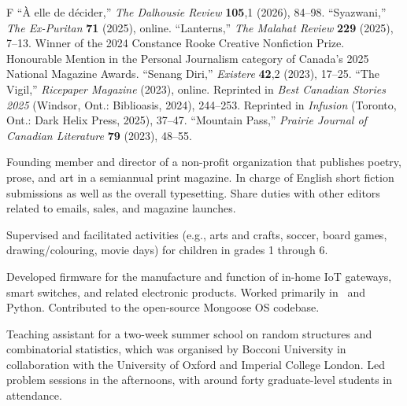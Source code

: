 \goodbreak
{}

\pubbegin F
\ficitem ``{\`A elle de d\'ecider,}'' {\sl The Dalhousie Review} {\bf 105},1 (2026), 84--98.
\ficitem ``Syazwani,'' {\sl The Ex-Puritan} {\bf 71} (2025), online.
\starficitem ``Lanterns,'' {\sl The Malahat Review} {\bf 229} (2025), 7--13.
Winner of the 2024 Constance Rooke Creative Nonfiction Prize. Honourable Mention in the Personal Journalism
category of Canada's 2025 National Magazine Awards.
\ficitem ``Senang Diri,'' {\sl Existere} {\bf 42},2 (2023), 17--25.
\ficitem ``The Vigil,'' {\sl Ricepaper Magazine} (2023), online. Reprinted in
{\sl Best Canadian Stories 2025} (Windsor, Ont.: Biblioasis, 2024), 244--253.
Reprinted in {\sl Infusion} (Toronto, Ont.: Dark Helix Press, 2025), 37--47.
\ficitem ``Mountain Pass,'' {\sl Prairie Journal of Canadian Literature} {\bf 79} (2023), 48--55.
\endgroup%


\smallskip
Founding member and director of a non-profit organization
that publishes poetry, prose, and art in a semiannual print magazine.
In charge of English short fiction submissions as well as the overall typesetting.
Share duties with other editors related to emails, sales, and magazine launches.
\medbreak

\smallskip
Supervised and facilitated activities (e.g., arts and crafts, soccer, board games, drawing/colouring, movie
days) for children in grades 1 through 6.
\medbreak

\smallskip
Developed firmware for the manufacture and function of in-home IoT gateways, smart switches,
and related electronic products. Worked primarily in \CEE\ and Python. Contributed to the open-source
Mongoose OS codebase.
\medbreak

\smallskip
Teaching assistant for a two-week summer school on random structures and combinatorial statistics,
which was
organised by Bocconi University in collaboration with the University of Oxford
and Imperial College London. Led problem sessions in the afternoons, with
around forty graduate-level students in attendance.
\medbreak

